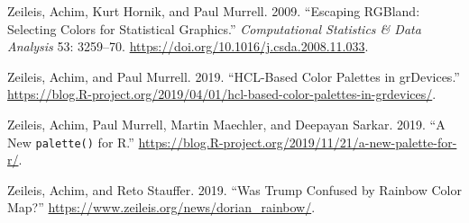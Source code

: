\begin{CSLReferences}{1}{0}
\leavevmode{}%
Zeileis, Achim, Kurt Hornik, and Paul Murrell. 2009. {``Escaping {RGB}land: Selecting Colors for Statistical Graphics.''} \emph{Computational Statistics \& Data Analysis} 53: 3259--70. \url{https://doi.org/10.1016/j.csda.2008.11.033}.

\leavevmode{}%
Zeileis, Achim, and Paul Murrell. 2019. {``{HCL}-Based Color Palettes in {grDevices}.''} \url{https://blog.R-project.org/2019/04/01/hcl-based-color-palettes-in-grdevices/}.

\leavevmode{}%
Zeileis, Achim, Paul Murrell, Martin Maechler, and Deepayan Sarkar. 2019. {``A New \texttt{palette()} for {R}.''} \url{https://blog.R-project.org/2019/11/21/a-new-palette-for-r/}.

\leavevmode{}%
Zeileis, Achim, and Reto Stauffer. 2019. {``Was {T}rump Confused by Rainbow Color Map?''} \url{https://www.zeileis.org/news/dorian_rainbow/}.

\end{CSLReferences}


\address{%
Achim Zeileis\\
Universität Innsbruck\\%
Department of Statistics\\
%
\url{https://www.zeileis.org/}\\%
\textit{ORCiD: \href{https://orcid.org/0000-0003-0918-3766}{0000-0003-0918-3766}}\\%
\href{mailto:Achim.Zeileis@R-project.org}{\nolinkurl{Achim.Zeileis@R-project.org}}%
}

\address{%
Paul Murrell\\
University of Auckland\\%
Department of Statistics\\
%
\url{https://www.stat.auckland.ac.nz/~paul/}\\%
\textit{ORCiD: \href{https://orcid.org/0000-0002-3224-8858}{0000-0002-3224-8858}}\\%
\href{mailto:paul@stat.auckland.ac.nz}{\nolinkurl{paul@stat.auckland.ac.nz}}%
}
